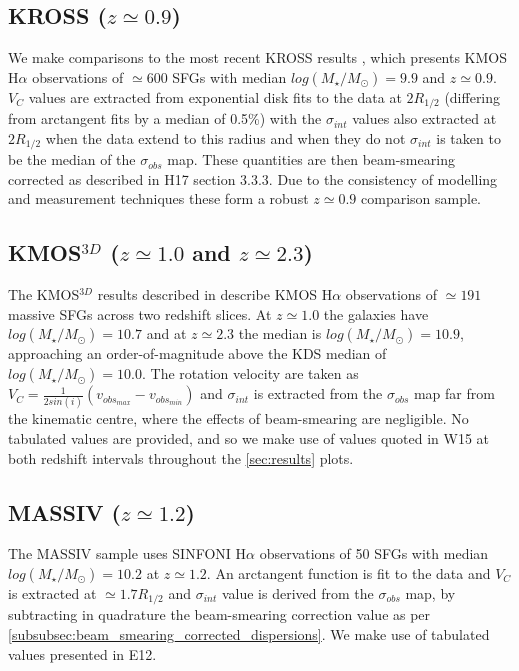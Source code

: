 \documentclass[fleqn,usenatbib]{mn2e}
\begin{document}
\subsection{KROSS ($z\simeq0.9$)}\label{subsec:KROSS}
We make comparisons to the most recent KROSS results \citep[H17]{Harrison2017}, which presents KMOS H$\alpha$ observations of $\simeq600$ SFGs with median $log(M_{\star}/M_{\odot})=9.9$ and $z\simeq0.9$.
$V_{C}$ values are extracted from exponential disk fits to the data at $2R_{1/2}$ (differing from arctangent fits by a median of 0.5\%) with the $\sigma_{int}$ values also extracted at $2R_{1/2}$ when the data extend to this radius and when they do not $\sigma_{int}$ is taken to be the median of the $\sigma_{obs}$ map.
These quantities are then beam-smearing corrected as described in H17 section 3.3.3. 
Due to the consistency of modelling and measurement techniques these form a robust $z\simeq0.9$ comparison sample.

\subsection{KMOS$^{3D}$ ($z\simeq1.0$ and $z\simeq2.3$)}\label{subsec:kmos_3d}
The KMOS$^{3D}$ results described in \cite[W15]{Wisnioski2015} describe KMOS H$\alpha$ observations of $\simeq191$ massive SFGs across two redshift slices. 
At $z\simeq1.0$ the galaxies have $log(M_{\star}/M_{\odot})=10.7$ and at $z\simeq2.3$ the median is $log(M_{\star}/M_{\odot})=10.9$, approaching an order-of-magnitude above the KDS median of $log(M_{\star}/M_{\odot})=10.0$.   The rotation velocity are taken as $V_{C} = \frac{1}{2sin(i)}(v_{obs_{max}} - v_{obs_{min}})$ and $\sigma_{int}$ is extracted from the $\sigma_{obs}$ map far from the kinematic centre, where the effects of beam-smearing are negligible.
No tabulated values are provided, and so we make use of values quoted in W15 at both redshift intervals throughout the \cref{sec:results} plots.

\subsection{MASSIV ($z\simeq1.2$)}\label{subsec:MASSIV}
The MASSIV sample \citep[E12]{Epinat2012} uses SINFONI H$\alpha$ observations of 50 SFGs with median $log(M_{\star}/M_{\odot})=10.2$ at $z\simeq1.2$.
An arctangent function is fit to the data and $V_{C}$ is extracted at $\simeq1.7R_{1/2}$ and $\sigma_{int}$ value is derived from the $\sigma_{obs}$ map, by subtracting in quadrature the beam-smearing correction value as per \cref{subsubsec:beam_smearing_corrected_dispersions}.
We make use of tabulated values presented in E12.
\end{document}

